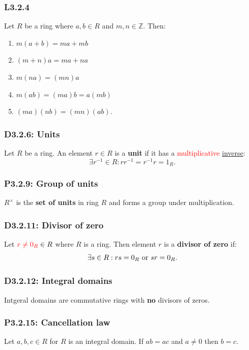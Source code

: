 \documentclass{article}
\begin{document}
\begin{multicols*}{3}
\subsubsection*{L3.2.4}
Let $R$ be a ring where $a,b\in R$ and
$m,n\in\mathbb{Z}$. Then:
\begin{enumerate}
    \item $m(a+b)=ma+mb$
    \item $(m+n)a=ma+na$
    \item $m(na)=(mn)a$
    \item $m(ab)=(ma)b=a(mb)$
    \item $(ma)(nb)=(mn)(ab).$
\end{enumerate}

\subsubsection*{D3.2.6: Units}
Let $R$ be a ring. An element $r\in R$
is a \textbf{unit} if it has a
\textcolor{red}{multiplicative} \underline{inverse}:
$$\exists r^{-1}\in R: rr^{-1}=r^{-1}r=1_R.$$

\subsubsection*{P3.2.9: Group of units}
$R^{\times}$ is the \textbf{set of units} in ring $R$
and forms a group under multiplication.

\subsubsection*{D3.2.11: Divisor of zero}
Let $\textcolor{red}{r\neq0_R}\in R$ where $R$ is a ring.
Then element $r$ is a \textbf{divisor of zero} if:
$$\exists s\in R: rs=0_R\hspace{0.05in}
\text{or}\hspace{0.05in}sr=0_R.$$

\subsubsection*{D3.2.12: Integral domains}
Intgeral domains are commutative rings
with \textbf{no} divisors of zeros.

\subsubsection*{P3.2.15: Cancellation law}
Let $a,b,c\in R$ for $R$ is an integral domain.
If $ab=ac$ and $a\neq0$ then $b=c$.


\end{multicols*}
\end{document}

